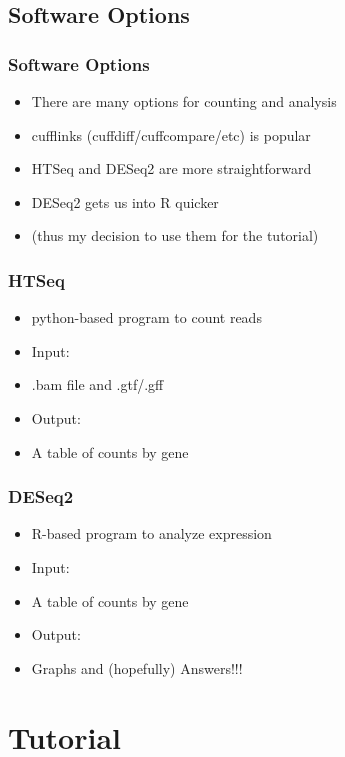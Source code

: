 \documentclass[14pt,handout]{beamer}
\begin{document}
\subsection{Software Options}

\begin{frame}
\frametitle{Software Options}
\begin{itemize}
	\item<+-> There are many options for counting and analysis
	\item<+-> cufflinks (cuffdiff/cuffcompare/etc) is popular
	\item<+-> HTSeq and DESeq2 are more straightforward
	\item<+-> DESeq2 gets us into R quicker
	\item<+-> (thus my decision to use them for the tutorial)
\end{itemize}
\end{frame}

\begin{frame}
\frametitle{HTSeq}
\begin{itemize}
	\item<+-> python-based program to count reads
	\item<+-> Input: 
	\item<+-> .bam file and .gtf/.gff
	\item<+-> Output:
	\item<+->  A table of counts by gene
\end{itemize}
\end{frame}

\begin{frame}
\frametitle{DESeq2}
\begin{itemize}
	\item<+-> R-based program to analyze expression
	\item<+-> Input: 
	\item<+-> A table of counts by gene
	\item<+-> Output: 
	\item<+-> Graphs and (hopefully) Answers!!!
\end{itemize}
\end{frame}

\section{Tutorial}
\end{document}
